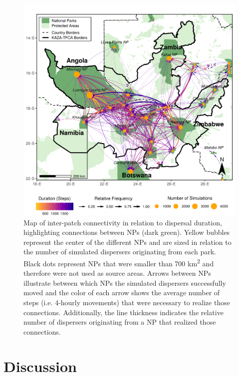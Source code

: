 \documentclass[abstract=on,10pt,a4paper,bibliography=totocnumbered]{article}
\begin{document}
\begin{figure}
  \includegraphics[width=\textwidth]{99_InterpatchConnectivity.png}
  \caption{Map of inter-patch connectivity in relation to dispersal duration,
  highlighting connections between NPs (dark green). Yellow bubbles represent
  the center of the different NPs and are sized in relation to the number of
  simulated dispersers originating from each park. Black dots represent NPs that
  were smaller than 700 km\textsuperscript{2} and therefore were not used as
  source areas. Arrows between NPs illustrate between which NPs the simulated
  dispersers successfully moved and the color of each arrow shows the average
  number of steps (i.e. 4-hourly movements) that were necessary to realize those
  connections. Additionally, the line thickness indicates the relative number of
  dispersers originating from a NP that realized those connections.}
  \label{InterpatchConnectivity}
\end{figure}

\section{Discussion}
\end{document}
